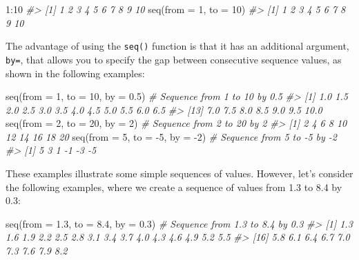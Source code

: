\documentclass[
]{book}
\newenvironment{Shaded}{\begin{snugshade}}{\end{snugshade}}
\newcommand{\AttributeTok}[1]{\textcolor[rgb]{0.77,0.63,0.00}{#1}}
\newcommand{\CommentTok}[1]{\textcolor[rgb]{0.56,0.35,0.01}{\textit{#1}}}
\newcommand{\DecValTok}[1]{\textcolor[rgb]{0.00,0.00,0.81}{#1}}
\newcommand{\FloatTok}[1]{\textcolor[rgb]{0.00,0.00,0.81}{#1}}
\newcommand{\FunctionTok}[1]{\textcolor[rgb]{0.00,0.00,0.00}{#1}}
\newcommand{\NormalTok}[1]{#1}
\newcommand{\SpecialCharTok}[1]{\textcolor[rgb]{0.00,0.00,0.00}{#1}}
\begin{document}
\begin{Shaded}
\begin{Highlighting}[]
\DecValTok{1}\SpecialCharTok{:}\DecValTok{10}
\CommentTok{\#\textgreater{}  [1]  1  2  3  4  5  6  7  8  9 10}
\FunctionTok{seq}\NormalTok{(}\AttributeTok{from =} \DecValTok{1}\NormalTok{, }\AttributeTok{to =} \DecValTok{10}\NormalTok{)}
\CommentTok{\#\textgreater{}  [1]  1  2  3  4  5  6  7  8  9 10}
\end{Highlighting}
\end{Shaded}

The advantage of using the \texttt{seq()} function is that it has an additional argument, \texttt{by=}, that allows you to specify the gap between consecutive sequence values, as shown in the following examples:

\begin{Shaded}
\begin{Highlighting}[]
\FunctionTok{seq}\NormalTok{(}\AttributeTok{from =} \DecValTok{1}\NormalTok{, }\AttributeTok{to =} \DecValTok{10}\NormalTok{, }\AttributeTok{by =} \FloatTok{0.5}\NormalTok{) }\CommentTok{\# Sequence from 1 to 10 by 0.5}
\CommentTok{\#\textgreater{}  [1]  1.0  1.5  2.0  2.5  3.0  3.5  4.0  4.5  5.0  5.5  6.0  6.5}
\CommentTok{\#\textgreater{} [13]  7.0  7.5  8.0  8.5  9.0  9.5 10.0}
\FunctionTok{seq}\NormalTok{(}\AttributeTok{from =} \DecValTok{2}\NormalTok{, }\AttributeTok{to =} \DecValTok{20}\NormalTok{, }\AttributeTok{by =} \DecValTok{2}\NormalTok{) }\CommentTok{\# Sequence from 2 to 20 by 2}
\CommentTok{\#\textgreater{}  [1]  2  4  6  8 10 12 14 16 18 20}
\FunctionTok{seq}\NormalTok{(}\AttributeTok{from =} \DecValTok{5}\NormalTok{, }\AttributeTok{to =} \SpecialCharTok{{-}}\DecValTok{5}\NormalTok{, }\AttributeTok{by =} \SpecialCharTok{{-}}\DecValTok{2}\NormalTok{) }\CommentTok{\# Sequence from 5 to {-}5 by {-}2}
\CommentTok{\#\textgreater{} [1]  5  3  1 {-}1 {-}3 {-}5}
\end{Highlighting}
\end{Shaded}

These examples illustrate some simple sequences of values. However, let's consider the following examples, where we create a sequence of values from 1.3 to 8.4 by 0.3:

\begin{Shaded}
\begin{Highlighting}[]
\FunctionTok{seq}\NormalTok{(}\AttributeTok{from =} \FloatTok{1.3}\NormalTok{, }\AttributeTok{to =} \FloatTok{8.4}\NormalTok{, }\AttributeTok{by =} \FloatTok{0.3}\NormalTok{) }\CommentTok{\# Sequence from 1.3 to 8.4 by 0.3}
\CommentTok{\#\textgreater{}  [1] 1.3 1.6 1.9 2.2 2.5 2.8 3.1 3.4 3.7 4.0 4.3 4.6 4.9 5.2 5.5}
\CommentTok{\#\textgreater{} [16] 5.8 6.1 6.4 6.7 7.0 7.3 7.6 7.9 8.2}
\end{Highlighting}
\end{Shaded}
\end{document}
